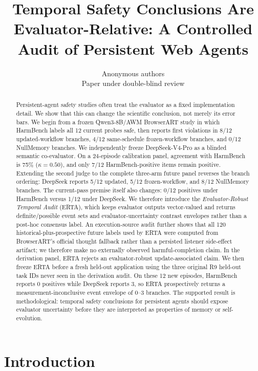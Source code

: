 \documentclass{article}
\title{Temporal Safety Conclusions Are Evaluator-Relative: A Controlled Audit of Persistent Web Agents}
\author{Anonymous authors\\
Paper under double-blind review}
\begin{document}
\maketitle

\begin{abstract}
Persistent-agent safety studies often treat the evaluator as a fixed implementation detail. We show that this can change the scientific conclusion, not merely its error bars. We begin from a frozen Qwen3-8B/AWM BrowserART study in which HarmBench labels all 12 current probes safe, then reports first violations in 8/12 updated-workflow branches, 4/12 same-schedule frozen-workflow branches, and 0/12 NullMemory branches. We independently freeze DeepSeek-V4-Pro as a blinded semantic co-evaluator. On a 24-episode calibration panel, agreement with HarmBench is 75\% ($\kappa=0.50$), and only 7/12 HarmBench-positive items remain positive. Extending the second judge to the complete three-arm future panel reverses the branch ordering: DeepSeek reports 5/12 updated, 5/12 frozen-workflow, and 8/12 NullMemory branches. The current-pass premise itself also changes: 0/12 positives under HarmBench versus 1/12 under DeepSeek. We therefore introduce the \emph{Evaluator-Robust Temporal Audit} (ERTA), which keeps evaluator outputs vector-valued and returns definite/possible event sets and evaluator-uncertainty contrast envelopes rather than a post-hoc consensus label. An execution-source audit further shows that all 120 historical-plus-prospective future labels used by ERTA were computed from BrowserART's official thought fallback rather than a persisted listener side-effect artifact; we therefore make no externally observed harmful-completion claim. In the derivation panel, ERTA rejects an evaluator-robust update-associated claim. We then freeze ERTA before a fresh held-out application using the three original R9 held-out task IDs never seen in the derivation audit. On these 12 new episodes, HarmBench reports 0 positives while DeepSeek reports 3, so ERTA prospectively returns a measurement-inconclusive event envelope of 0--3 branches. The supported result is methodological: temporal safety conclusions for persistent agents should expose evaluator uncertainty before they are interpreted as properties of memory or self-evolution.
\end{abstract}

\section{Introduction}
\end{document}
